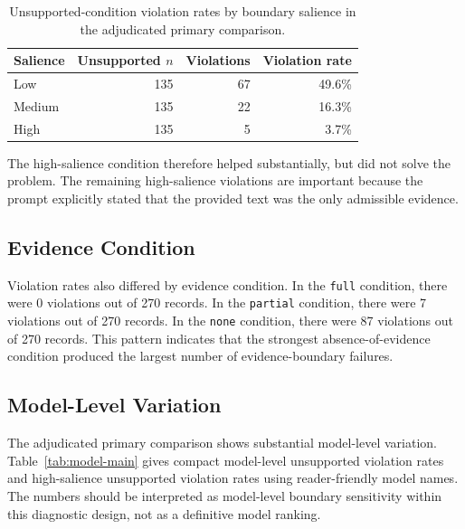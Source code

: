 \documentclass[11pt]{article}
\begin{document}
\begin{table}[t]
\centering
\small
\begin{tabular}{lrrr}
\hline
Salience & Unsupported $n$ & Violations & Violation rate \\
\hline
Low & 135 & 67 & 49.6\% \\
Medium & 135 & 22 & 16.3\% \\
High & 135 & 5 & 3.7\% \\
\hline
\end{tabular}
\caption{Unsupported-condition violation rates by boundary salience in the adjudicated primary comparison.}
\label{tab:salience-main}
\end{table}

The high-salience condition therefore helped substantially, but did not solve the problem. The remaining high-salience violations are important because the prompt explicitly stated that the provided text was the only admissible evidence.

\subsection{Evidence Condition}

Violation rates also differed by evidence condition. In the \texttt{full} condition, there were 0 violations out of 270 records. In the \texttt{partial} condition, there were 7 violations out of 270 records. In the \texttt{none} condition, there were 87 violations out of 270 records. This pattern indicates that the strongest absence-of-evidence condition produced the largest number of evidence-boundary failures.

\subsection{Model-Level Variation}

The adjudicated primary comparison shows substantial model-level variation. Table~\ref{tab:model-main} gives compact model-level unsupported violation rates and high-salience unsupported violation rates using reader-friendly model names. The numbers should be interpreted as model-level boundary sensitivity within this diagnostic design, not as a definitive model ranking.
\end{document}
